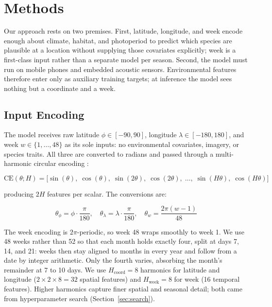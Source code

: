 \section{Methods}
\label{sec:methods}

Our approach rests on two premises. First, latitude, longitude, and week encode enough about climate, habitat, and photoperiod to predict which species are plausible at a location without supplying those covariates explicitly; week is a first-class input rather than a separate model per season. Second, the model must run on mobile phones and embedded acoustic sensors. Environmental features therefore enter only as auxiliary training targets; at inference the model sees nothing but a coordinate and a week.

\subsection{Input Encoding}
\label{sec:encoding}

The model receives raw latitude $\phi \in [-90, 90]$, longitude $\lambda \in [-180, 180]$, and week $w \in \{1, \ldots, 48\}$ as its sole inputs: no environmental covariates, imagery, or species traits. All three are converted to radians and passed through a multi-harmonic circular encoding \citep{tancik2020fourier}:

\begin{equation*}
\text{CE}(\theta; H) = \bigl[\sin(\theta),\; \cos(\theta),\; \sin(2\theta),\; \cos(2\theta),\; \ldots,\; \sin(H\theta),\; \cos(H\theta)\bigr]
\end{equation*}

producing $2H$ features per scalar. The conversions are:

\begin{equation*}
\theta_\phi = \phi \cdot \frac{\pi}{180}, \quad
\theta_\lambda = \lambda \cdot \frac{\pi}{180}, \quad
\theta_w = \frac{2\pi (w - 1)}{48}
\end{equation*}

The week encoding is $2\pi$-periodic, so week 48 wraps smoothly to week 1. We use 48 weeks rather than 52 so that each month holds exactly four, split at days 7, 14, and 21: weeks then stay aligned to months in every year and follow from a date by integer arithmetic. Only the fourth varies, absorbing the month's remainder at 7 to 10 days. We use $H_\text{coord} = 8$ harmonics for latitude and longitude ($2 \times 2 \times 8 = 32$ spatial features) and $H_\text{week} = 8$ for week (16 temporal features). Higher harmonics capture finer spatial and seasonal detail; both came from hyperparameter search (Section~\ref{sec:search}).

